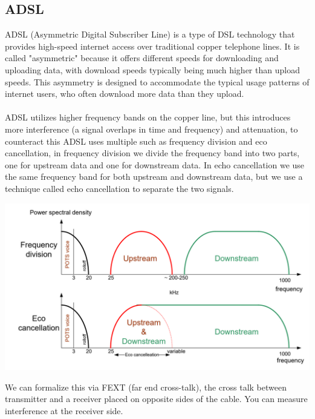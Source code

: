 \documentclass[11pt, a4paper]{article}
\begin{document}
\subsection{ADSL}
ADSL (Asymmetric Digital Subscriber Line) is a type of DSL technology that provides high-speed internet access over traditional copper telephone lines. It is called "asymmetric" because it offers different speeds for downloading and uploading data, with download speeds typically being much higher than upload speeds. This asymmetry is designed to accommodate the typical usage patterns of internet users, who often download more data than they upload.\\\\
ADSL utilizes higher frequency bands on the copper line, but this introduces more interference (a signal overlaps in time and frequency) and attenuation, to counteract this ADSL uses multiple such as frequency division and eco cancellation, in frequency division we divide the frequency band into two parts, one for upstream data and one for downstream data. In echo cancellation we use the same frequency band for both upstream and downstream data, but we use a technique called echo cancellation to separate the two signals.\\
\begin{center}
    \includegraphics[scale=0.5]{img/AccessNetworks/XDSL/Frequency.png}
\end{center}
We can formalize this via FEXT (far end cross-talk), the cross talk between transmitter and a receiver placed on opposite sides of the cable. You can measure interference at the receiver side.
\end{document}
